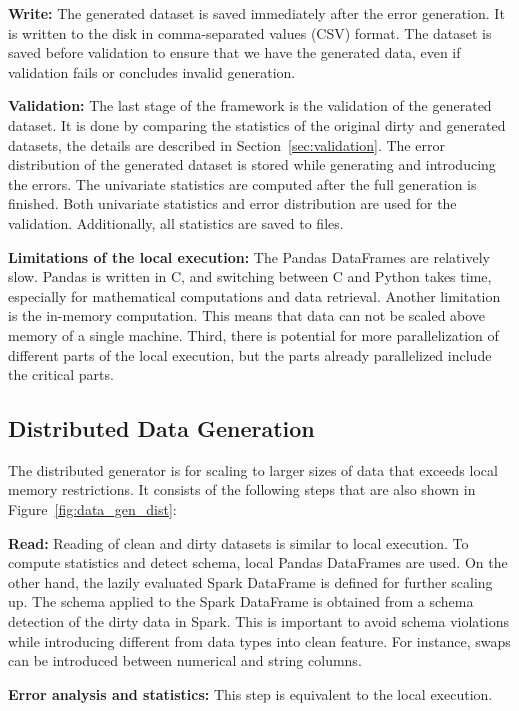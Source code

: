 \textbf{Write:}  
The generated dataset is saved immediately after the error generation. It is written to the disk in comma-separated values (CSV) format. 
The dataset is saved before validation to ensure that we have the generated data, even if validation fails or concludes invalid generation.


\textbf{Validation:} 
The last stage of the framework is the validation of the generated dataset. 
It is done by comparing the statistics of the original dirty and generated datasets, the details are described in Section~\ref{sec:validation}.
The error distribution of the generated dataset is stored while generating and introducing the errors.
The univariate statistics are computed after the full generation is finished.
Both univariate statistics and error distribution are used for the validation. 
Additionally, all statistics are saved to files.

\textbf{Limitations of the local execution:} 
The Pandas DataFrames are relatively slow. Pandas is written in C, and switching between C and Python takes time, especially for mathematical computations and data retrieval.
Another limitation is the in-memory computation. This means that data can not be scaled above memory of a single machine.
Third, there is potential for more parallelization of different parts of the local execution, but the parts already parallelized include the critical parts.


\subsection{Distributed Data Generation}
\label{sec:distributed_generator}

The distributed generator is for scaling to larger sizes of data that exceeds local memory restrictions.
It consists of the following steps that are also shown in Figure~\ref{fig:data_gen_dist}:

\textbf{Read:} 
Reading of clean and dirty datasets is similar to local execution. 
To compute statistics and detect schema, local Pandas DataFrames are used. 
On the other hand, the lazily evaluated Spark DataFrame is defined for further scaling up.
The schema applied to the Spark DataFrame is obtained from a schema detection of the dirty data in Spark.
This is important to avoid schema violations while introducing different from data types into clean feature.  
For instance, swaps can be introduced between numerical and string columns.

\textbf{Error analysis and statistics: } This step is equivalent to the local execution.

